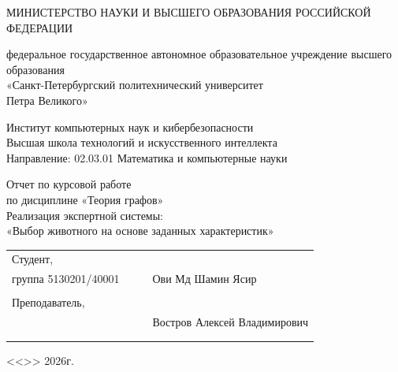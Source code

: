 \documentclass[a4paper,final]{article}
\begin{document}
	\begin{center}
		\normalsize\bf{{МИНИСТЕРСТВО НАУКИ И ВЫСШЕГО ОБРАЗОВАНИЯ РОССИЙСКОЙ ФЕДЕРАЦИИ}

			\hfill \break
			федеральное государственное автономное образовательное учреждение высшего образования\\ «Санкт-Петербургский политехнический университет\\ Петра Великого»\\[10pt]}
		\hfill \break
		\normalsize{Институт компьютерных наук и кибербезопасности}\\[10pt]

		\normalsize{Высшая школа технологий и искусственного интеллекта}\\[10pt]

		\normalsize{Направление: 02.03.01 Математика и компьютерные науки}\\
		\vspace{50pt}

		\vspace{1pt}
		\begin{center}
Отчет по курсовой работе\\
по дисциплине «Теория графов»\\
Реализация экспертной системы:\\
«Выбор животного на основе заданных характеристик»

		\end{center}

		\hfill \break
		\hfill \break
	\end{center}
	\small{ \bf
		\begin{tabular}{lrrl}
			\!\!\!Студент, & \hspace{0cm} & & \\
			\!\!\!группа 5130201/40001 & \hspace{1.5cm} & \underline{\hspace{3cm}} & \hspace{-0.3cm}Ови Мд Шамин Ясир  \\\\
			\!\!\!Преподаватель, & \hspace{1cm} & \\
			\!\!\! & \hspace{0.1cm} & \underline{\hspace{3cm}} &  Востров Алексей Владимирович\\\\
			&&\hspace{3.5cm}
		\end{tabular}
		\begin{flushright}
			<<\underline{\hspace{1cm}}>>\underline{\hspace{2.5cm}} 2026г.
		\end{flushright}
	}
\end{document}
